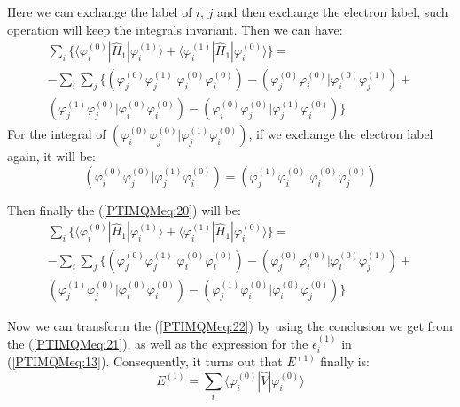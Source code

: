 Here we can exchange the label of $i$, $j$ and then exchange the
electron label, such operation will keep the integrals invariant.
Then we can have:
\begin{multline}\label{PTIMQMeq:20}
\sum_{i}\Bigg\{
\langle\varphi^{(0)}_{i}|\hat{H}_{1}|\varphi^{(1)}_{i}\rangle +
\langle\varphi^{(1)}_{i}|\hat{H}_{1}|\varphi^{(0)}_{i}\rangle
\Bigg\}= \\
-\sum_{i}\sum_{j}\Bigg\{
\left(\varphi^{(0)}_{j}\varphi^{(1)}_{j}|\varphi^{(0)}_{i}\varphi^{(0)}_{i}\right)
-
\left(\varphi^{(0)}_{j}\varphi^{(0)}_{i}|\varphi^{(0)}_{i}\varphi^{(1)}_{j}\right)
+ \\
\left(\varphi^{(1)}_{j}\varphi^{(0)}_{j}|\varphi^{(0)}_{i}\varphi^{(0)}_{i}\right)
-
\left(\varphi^{(0)}_{i}\varphi^{(0)}_{j}|\varphi^{(1)}_{j}\varphi^{(0)}_{i}\right)
\Bigg\}
\end{multline}
For the integral of
$\left(\varphi^{(0)}_{i}\varphi^{(0)}_{j}|\varphi^{(1)}_{j}\varphi^{(0)}_{i}\right)$,
if we exchange the electron label again, it will be:
\begin{equation}\label{}
\left(\varphi^{(0)}_{i}\varphi^{(0)}_{j}|\varphi^{(1)}_{j}\varphi^{(0)}_{i}\right)=
\left(\varphi^{(1)}_{j}\varphi^{(0)}_{i}|\varphi^{(0)}_{i}\varphi^{(0)}_{j}\right)
\end{equation}

Then finally the (\ref{PTIMQMeq:20}) will be:
\begin{multline}\label{PTIMQMeq:21}
\sum_{i}\Bigg\{
\langle\varphi^{(0)}_{i}|\hat{H}_{1}|\varphi^{(1)}_{i}\rangle +
\langle\varphi^{(1)}_{i}|\hat{H}_{1}|\varphi^{(0)}_{i}\rangle
\Bigg\}= \\
-\sum_{i}\sum_{j}\Bigg\{
\left(\varphi^{(0)}_{j}\varphi^{(1)}_{j}|\varphi^{(0)}_{i}\varphi^{(0)}_{i}\right)
-
\left(\varphi^{(0)}_{j}\varphi^{(0)}_{i}|\varphi^{(0)}_{i}\varphi^{(1)}_{j}\right)
+ \\
\left(\varphi^{(1)}_{j}\varphi^{(0)}_{j}|\varphi^{(0)}_{i}\varphi^{(0)}_{i}\right)
-
\left(\varphi^{(1)}_{j}\varphi^{(0)}_{i}|\varphi^{(0)}_{i}\varphi^{(0)}_{j}\right)
\Bigg\}
\end{multline}

Now we can transform the (\ref{PTIMQMeq:22}) by using the conclusion
we get from the (\ref{PTIMQMeq:21}), as well as the expression for
the $\epsilon^{(1)}_{i}$ in (\ref{PTIMQMeq:13}). Consequently, it
turns out that $E^{(1)}$ finally is:
\begin{equation}\label{}
E^{(1)} = \sum_{i}
\langle\varphi^{(0)}_{i}|\hat{V}|\varphi^{(0)}_{i}\rangle
\end{equation}


